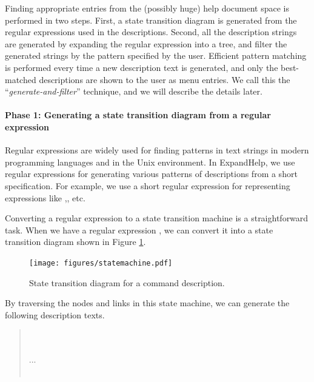 \documentclass{sigchi}
\def\EH{\textsf{ExpandHelp}}
\begin{document}
Finding appropriate entries from the (possibly huge) help document space is
performed in two steps.
First, a state transition diagram is generated from the regular expressions
used in the descriptions.
Second, all the description strings are generated by expanding the regular expression
into a tree, and filter the generated strings by the pattern specified by the user.
Efficient pattern matching is performed every time a new description text is generated,
and only the best-matched descriptions are shown to the user as menu entries.
We call this the ``\textit{generate-and-filter}'' technique,
and we will describe the details later.

\paragraph{Phase 1: Generating a state transition diagram from a regular expression}

Regular expressions are widely used for finding patterns in text strings
in modern programming languages and in the Unix environment.
In {\EH}, we use regular expressions for
generating various patterns of descriptions from a short specification.
For example, we use a short regular expression
for representing expressions like
,, etc.

Converting a regular expression to a state transition machine is a
straightforward task.
When we have a regular expression
, 
we can convert it into a state transition diagram
shown in Figure \ref{statemachine1}.

\begin{figure}[htb]
\texttt{[image: figures/statemachine.pdf]}
\caption{State transition diagram for a  command description.}
\label{statemachine1}
\end{figure}

By traversing the nodes and links in this state machine,
we can generate the following description texts.

\begin{quote}
\small
{} \\
 \\
...\\
\\
\end{quote}
\end{document}

